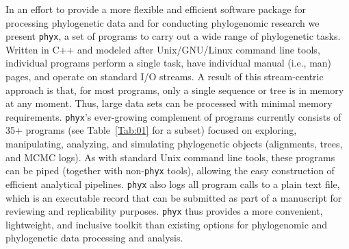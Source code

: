 \documentclass{bioinfo}
\begin{document}
In an effort to provide a more flexible and efficient software package for processing phylogenetic data and for conducting phylogenomic research we present \texttt{phyx}, a set of programs to carry
out a wide range of phylogenetic tasks. Written in C++ and modeled after
Unix/GNU/Linux command line tools, individual programs perform a single task,
have individual manual (i.e., man) pages, and operate on standard I/O streams. A result of
this stream-centric approach is that, for most programs, only a single sequence
or tree is in memory at any moment. Thus, large data sets can be
processed with minimal memory requirements. \texttt{phyx}'s
ever-growing complement of programs currently consists of 35+ programs
(see Table~\ref{Tab:01} for a subset) focused on exploring, manipulating, analyzing,
and simulating phylogenetic objects (alignments, trees, and MCMC logs).
As with standard Unix command line tools, these programs can be piped
(together with non-\texttt{phyx} tools), allowing the easy construction
of efficient analytical pipelines. \texttt{phyx} also logs all program calls
to a plain text file, which is an executable record that can be submitted as
part of a manuscript for reviewing and replicability purposes. 
\texttt{phyx} thus provides a more convenient, lightweight, and inclusive toolkit than existing options for phylogenomic and phylogenetic data processing and analysis. 
\end{document}
